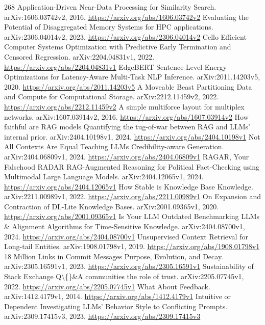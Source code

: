 \documentclass[11pt]{article}
\begin{document}
\begin{thebibliography}{268}
 Application-Driven Near-Data Processing for Similarity Search. arXiv:1606.03742v2, 2016. \url{https://arxiv.org/abs/1606.03742v2}
 Evaluating the Potential of Disaggregated Memory Systems for HPC applications. arXiv:2306.04014v2, 2023. \url{https://arxiv.org/abs/2306.04014v2}
 Cello Efficient Computer Systems Optimization with Predictive Early Termination and Censored Regression. arXiv:2204.04831v1, 2022. \url{https://arxiv.org/abs/2204.04831v1}
 EdgeBERT Sentence-Level Energy Optimizations for Latency-Aware Multi-Task NLP Inference. arXiv:2011.14203v5, 2020. \url{https://arxiv.org/abs/2011.14203v5}
 A Moveable Beast Partitioning Data and Compute for Computational Storage. arXiv:2212.11459v2, 2022. \url{https://arxiv.org/abs/2212.11459v2}
 A simple multiforce layout for multiplex networks. arXiv:1607.03914v2, 2016. \url{https://arxiv.org/abs/1607.03914v2}
 How faithful are RAG models Quantifying the tug-of-war between RAG and LLMs' internal prior. arXiv:2404.10198v1, 2024. \url{https://arxiv.org/abs/2404.10198v1}
 Not All Contexts Are Equal Teaching LLMs Credibility-aware Generation. arXiv:2404.06809v1, 2024. \url{https://arxiv.org/abs/2404.06809v1}
 RAGAR, Your Falsehood RADAR RAG-Augmented Reasoning for Political Fact-Checking using Multimodal Large Language Models. arXiv:2404.12065v1, 2024. \url{https://arxiv.org/abs/2404.12065v1}
 How Stable is Knowledge Base Knowledge. arXiv:2211.00989v1, 2022. \url{https://arxiv.org/abs/2211.00989v1}
 On Expansion and Contraction of DL-Lite Knowledge Bases. arXiv:2001.09365v1, 2020. \url{https://arxiv.org/abs/2001.09365v1}
 Is Your LLM Outdated Benchmarking LLMs \& Alignment Algorithms for Time-Sensitive Knowledge. arXiv:2404.08700v1, 2024. \url{https://arxiv.org/abs/2404.08700v1}
 Unsupervised Context Retrieval for Long-tail Entities. arXiv:1908.01798v1, 2019. \url{https://arxiv.org/abs/1908.01798v1}
 18 Million Links in Commit Messages Purpose, Evolution, and Decay. arXiv:2305.16591v1, 2023. \url{https://arxiv.org/abs/2305.16591v1}
 Sustainability of Stack Exchange Q\textbackslash\{\}\&A communities the role of trust. arXiv:2205.07745v1, 2022. \url{https://arxiv.org/abs/2205.07745v1}
 What About Feedback. arXiv:1412.4179v1, 2014. \url{https://arxiv.org/abs/1412.4179v1}
 Intuitive or Dependent Investigating LLMs' Behavior Style to Conflicting Prompts. arXiv:2309.17415v3, 2023. \url{https://arxiv.org/abs/2309.17415v3}

\end{thebibliography}
\end{document}
